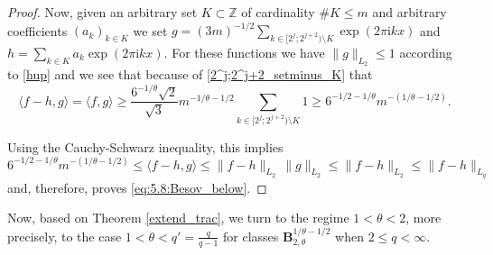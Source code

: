\documentclass[11pt,reqno]{article}
\numberwithin{equation}{section}
\theoremstyle{definition}
\theoremstyle{plain}
\newcommand{\zz}{\ensuremath{\mathbb{Z}}}
\begin{document}
\begin{proof}


 Now, given an arbitrary set \(K \subset \zz\) of cardinality \(\# K \leq m\) and arbitrary coefficients \((a_k)_{k \in K}\) we set \(g =  (3m)^{-1/2} \sum_{k\in [2^j;  2^{j+2}) \setminus K} \exp(2 \pi \mathrm{i} k x) \) and \(h =  \sum_{k \in K} a_{k} \exp(2 \pi \mathrm{i} k x)\). For these functions we have $\|g\|_{L_2}\leq 1$  according to \eqref{hup} and we see that because of \eqref{2^j;2^j+2_setminus_K}
 that
 \begin{equation}  \label{tangle2}
 \langle f-h,g \rangle  = \langle f,g \rangle 
 \geq \frac{6^{-1/\theta}\sqrt{2}}{\sqrt{3}} m^{-1/\theta-1/2} \sum_{k \in  [2^j;  2^{j+2})  \setminus K} 1 
 \geq  6^{-1/2-1/\theta} m^{-(1/\theta-1/2)} .
 \end{equation}

 Using the Cauchy-Schwarz inequality, this implies 
  \begin{equation} 
 6^{-1/2-1/\theta} m^{-(1/\theta-1/2)} \leq \langle f-h,g \rangle \leq \|f - h\|_{L_2}\, \|g\|_{L_2} \leq \|f - h\|_{L_2} \leq \|f - h\|_{L_q}
 \end{equation}
and, therefore, proves    \eqref{eq:5.8:Besov_below}. 
\end{proof}

Now, based on Theorem \ref{extend_trac},  we turn to the regime 
\(1<\theta < 2\), 
more precisely, to the case 
\(1< \theta<q'=\frac{q}{q-1}\) 
for classes $\mathbf{B}^{1/\theta-1/2}_{2,\theta}$ 
when \(2\le q<\infty\).
\end{document}
